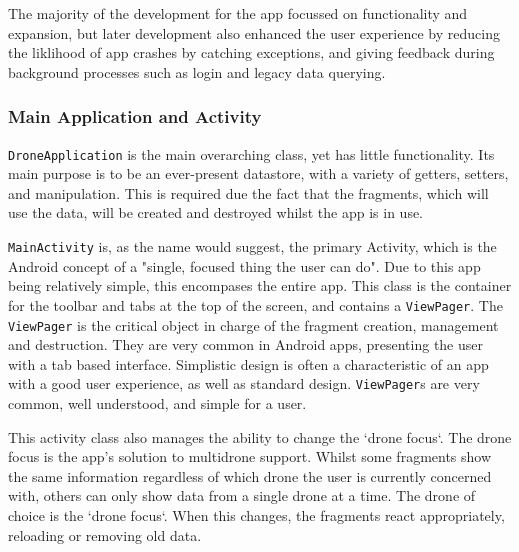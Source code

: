 \documentclass{article}
\begin{document}
The majority of the development for the app focussed on functionality and expansion, but later development also enhanced the user experience by reducing the liklihood of app crashes by catching exceptions, and giving feedback during background processes such as login and legacy data querying. 

\subsubsection{Main Application and Activity}
\texttt{DroneApplication} is the main overarching class, yet has little functionality. Its main purpose is to be an ever-present datastore, with a variety of getters, setters, and manipulation. This is required due the fact that the fragments, which will use the data, will be created and destroyed whilst the app is in use. 

\texttt{MainActivity} is, as the name would suggest, the primary Activity, which is the Android concept of a "single, focused thing the user can do"\cite{androidActivity}. Due to this app being relatively simple, this encompases the entire app. This class is the container for the toolbar and tabs at the top of the screen, and contains a \texttt{ViewPager}. The \texttt{ViewPager} is the critical object in charge of the fragment creation, management and destruction. They are very common in Android apps, presenting the user with a tab based interface. Simplistic design is often a characteristic of an app with a good user experience, as well as standard design. \texttt{ViewPager}s are very common, well understood, and simple for a user. 

This activity class also manages the ability to change the `drone focus`. The drone focus is the app's solution to multidrone support. Whilst some fragments show the same information regardless of which drone the user is currently concerned with, others can only show data from a single drone at a time. The drone of choice is the `drone focus`. When this changes, the fragments react appropriately, reloading or removing old data. 
\end{document}
